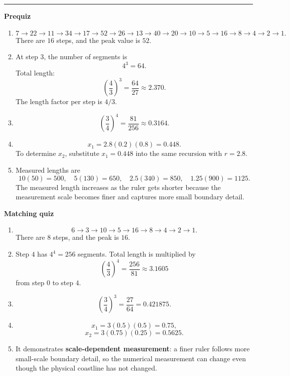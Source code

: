\documentclass[10pt]{article}
\newcommand{\modulekey}[2]{\clearpage{\Large\bfseries\textcolor{olive}{Module #1: #2 — Answer Key}}\par\textcolor{gold}{\rule{\linewidth}{1.2pt}}\par}
\begin{document}
\modulekey{10}{Fractal Geometry and the Limits of Prediction}
\textbf{Prequiz}
\begin{enumerate}
\item
\[
7\to22\to11\to34\to17\to52\to26\to13\to40\to20\to10\to5\to16\to8\to4\to2\to1.
\]
There are \(\boxed{16}\) steps, and the peak value is \(\boxed{52}\).
\item At step \(3\), the number of segments is
\[
4^3=\boxed{64}.
\]
Total length:
\[
\left(\frac43\right)^3=\frac{64}{27}\approx\boxed{2.370}.
\]
The length factor per step is \(\boxed{4/3}\).
\item
\[
\left(\frac34\right)^4=\frac{81}{256}\approx\boxed{0.3164}.
\]
\item
\[
x_1=2.8(0.2)(0.8)=\boxed{0.448}.
\]
To determine \(x_2\), substitute \(x_1=0.448\) into the same recursion with \(r=2.8\).
\item Measured lengths are
\[
10(50)=500,\quad5(130)=650,\quad2.5(340)=850,\quad1.25(900)=1125.
\]
The measured length increases as the ruler gets shorter because the measurement scale becomes finer and captures more small boundary detail.
\end{enumerate}

\textbf{Matching quiz}
\begin{enumerate}
\item
\[
6\to3\to10\to5\to16\to8\to4\to2\to1.
\]
There are \(\boxed8\) steps, and the peak is \(\boxed{16}\).
\item Step \(4\) has \(4^4=\boxed{256}\) segments. Total length is multiplied by
\[
\left(\frac43\right)^4=\frac{256}{81}\approx\boxed{3.1605}
\]
from step \(0\) to step \(4\).
\item
\[
\left(\frac34\right)^3=\frac{27}{64}=\boxed{0.421875}.
\]
\item
\[
x_1=3(0.5)(0.5)=\boxed{0.75},
\]
\[
x_2=3(0.75)(0.25)=\boxed{0.5625}.
\]
\item It demonstrates \textbf{scale-dependent measurement}: a finer ruler follows more small-scale boundary detail, so the numerical measurement can change even though the physical coastline has not changed.
\end{enumerate}
\end{document}
